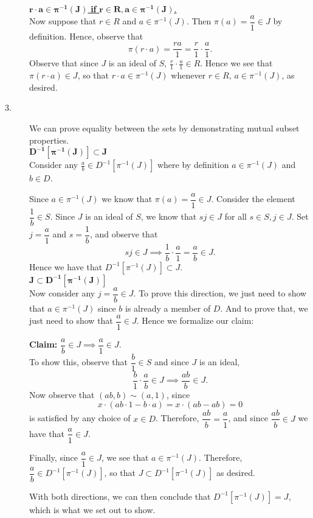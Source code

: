 \begin{prf}
\begin{description}
        \noindent\underline{$\bm{r\cdot a \in \pi^{-1}(J)}$ \textbf{if}
        $\bm{r \in R, a \in \pi^{-1}(J)}$.}\\[1.2ex]
        Now suppose that $r \in R$ and $a \in \pi^{-1}(J)$. Then $\pi(a) =
        \dfrac{a}{1} \in J$ by definition. Hence, observe that 
        \[
            \pi(r \cdot a) = \dfrac{ra}{1} = \frac{r}{1} \cdot \frac{a}{1}.
        \]
        Observe that since $J$ is an ideal of $S$, $\frac{r}{1} \cdot \frac{a}{1}
        \in R$. Hence we see that $\pi(r \cdot a) \in J$, so that $r \cdot
        a \in \pi^{-1}(J)$ whenever $r \in R$, $a \in \pi^{-1}(J)$, as
        desired. 
    
        \item[3.] We can prove equality between the sets by demonstrating
        mutual subset properties. \\
        \noindent\underline{$\bm{D^{-1}[\pi^{-1}(J)] \subset J}$}\\[1.2ex]
        Consider any $\frac{a}{b} \in D^{-1}[\pi^{-1}(J)]$ where by definition $a \in
        \pi^{-1}(J)$ and $b \in D$. 
    
        Since $a \in \pi^{-1}(J)$ we know that $\pi(a) = \dfrac{a}{1} \in
        J$. Consider the element $\dfrac{1}{b} \in S$. Since $J$ is an
        ideal of $S$, we know that $sj \in J$ for all $s \in S, j \in J$.
        Set $j = \dfrac{a}{1}$ and $s = \dfrac{1}{b}$, and observe that 
        \[
            sj \in J \implies \frac{1}{b} \cdot \frac{a}{1} = \frac{a}{b} \in J.
        \]
        Hence we have that $D^{-1}[\pi^{-1}(J)] \subset J$. 
        \\
        \noindent\underline{$\bm{J \subset D^{-1}[\pi^{-1}(J)]}$}\\[1.2ex]
        Now consider any $j = \dfrac{a}{b} \in J$. To prove this direction,
        we just need to show that $a \in \pi^{-1}(J)$ since $b$ is already
        a member of $D$. And to prove that, we just need to show that
        $\dfrac{a}{1} \in J$. Hence we formalize our claim:
    
        \textbf{Claim:} $\dfrac{a}{b} \in J \implies \dfrac{a}{1} \in J$.\\
        To show this, observe that $\dfrac{b}{1} \in S$ and since $J$ is an
        ideal, 
        \[
            \frac{b}{1} \cdot \frac{a}{b} \in J \implies \frac{ab}{b} \in J.
        \]
        Now observe that $(ab, b) \sim (a, 1)$, since 
        \[
            x \cdot (ab\cdot 1 -b\cdot a) = x \cdot (ab - ab) = 0
        \]
        is satisfied by any choice of $x \in D$. Therefore, $\dfrac{ab}{b}
        = \dfrac{a}{1}$, and since $\dfrac{ab}{b} \in J$ we have that
        $\dfrac{a}{1} \in J$. 
    
        Finally, since $\dfrac{a}{1} \in J$, we see that $a \in
        \pi^{-1}(J)$. Therefore, $\dfrac{a}{b} \in D^{-1}[\pi^{-1}(J)]$, so
        that $J \subset D^{-1}[\pi^{-1}(J)]$ as desired. 
    
        With both directions, we can then conclude that
        $D^{-1}[\pi^{-1}(J)] = J$, which is what we set out to show.
        \end{description}
    \end{prf}

